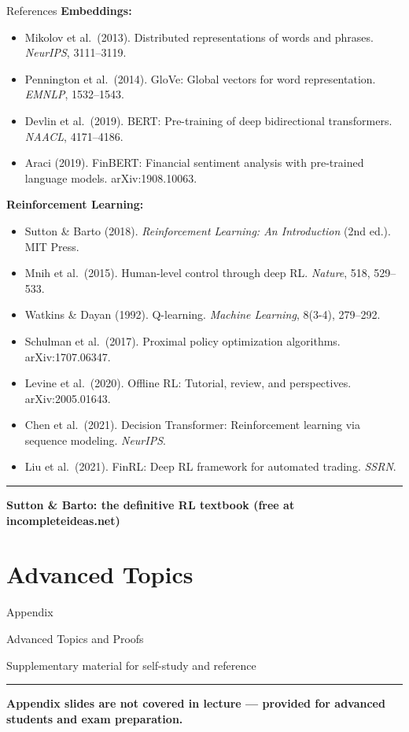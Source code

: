 \documentclass[8pt,aspectratio=169]{beamer}
\newcommand{\bottomnote}[1]{%
\vfill
\vspace{-2mm}
\textcolor{mllavender2}{\rule{\textwidth}{0.4pt}}
\vspace{1mm}
\footnotesize
\textbf{#1}
}
\begin{document}
\begin{frame}[t]{References}
\scriptsize
\textbf{Embeddings:}
\begin{itemize}
\item Mikolov et al.\ (2013). Distributed representations of words and phrases. \textit{NeurIPS}, 3111--3119.
\item Pennington et al.\ (2014). GloVe: Global vectors for word representation. \textit{EMNLP}, 1532--1543.
\item Devlin et al.\ (2019). BERT: Pre-training of deep bidirectional transformers. \textit{NAACL}, 4171--4186.
\item Araci (2019). FinBERT: Financial sentiment analysis with pre-trained language models. arXiv:1908.10063.
\end{itemize}
\vspace{-0.3em}
\textbf{Reinforcement Learning:}
\begin{itemize}
\item Sutton \& Barto (2018). \textit{Reinforcement Learning: An Introduction} (2nd ed.). MIT Press.
\item Mnih et al.\ (2015). Human-level control through deep RL. \textit{Nature}, 518, 529--533.
\item Watkins \& Dayan (1992). Q-learning. \textit{Machine Learning}, 8(3-4), 279--292.
\item Schulman et al.\ (2017). Proximal policy optimization algorithms. arXiv:1707.06347.
\item Levine et al.\ (2020). Offline RL: Tutorial, review, and perspectives. arXiv:2005.01643.
\item Chen et al.\ (2021). Decision Transformer: Reinforcement learning via sequence modeling. \textit{NeurIPS}.
\item Liu et al.\ (2021). FinRL: Deep RL framework for automated trading. \textit{SSRN}.
\end{itemize}
\bottomnote{Sutton \& Barto: the definitive RL textbook (free at incompleteideas.net)}
\end{frame}


\appendix
\section*{Advanced Topics}

\begin{frame}
\begin{center}
\vspace{2cm}
{\Huge \textcolor{mlpurple}{Appendix}}

\vspace{0.5cm}
{\Large Advanced Topics and Proofs}

\vspace{0.5cm}
{\normalsize Supplementary material for self-study and reference}
\end{center}
\bottomnote{Appendix slides are not covered in lecture --- provided for advanced students and exam preparation.}
\end{frame}
\end{document}
